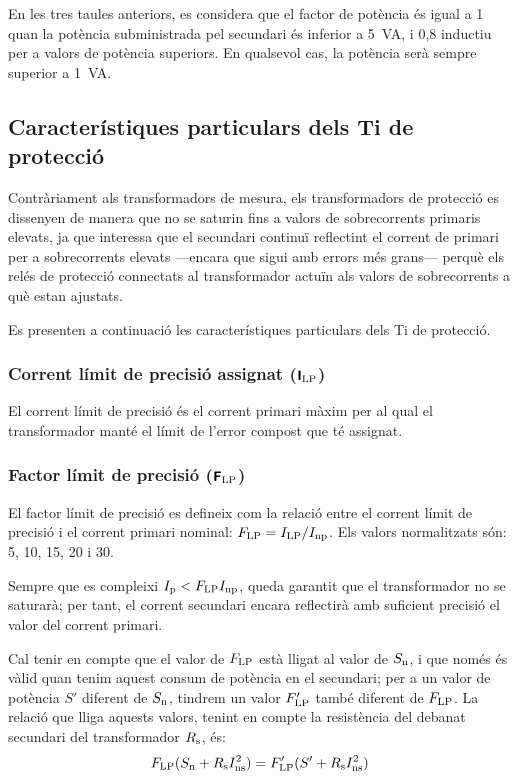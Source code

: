 En les tres taules anteriors, es considera que el factor de
potència és igual a 1 quan la potència subministrada pel secundari és inferior a \qty{5}{VA}, i 0,8 inductiu per a valors de potència superiors. En qualsevol cas, la potència serà sempre superior a \qty{1}{VA}.


\subsection{Característiques particulars dels Ti de protecció}

Contràriament als transformadors de mesura, els transformadors de
protecció es dissenyen de manera que no se saturin fins a  valors
de sobrecorrents primaris elevats, ja que interessa que el
secundari continuï reflectint el corrent de primari per a
 sobrecorrents elevats ---encara que sigui amb errors més grans--- perquè els relés de protecció connectats al transformador actuïn
als valors de sobrecorrents a què estan ajustats.

Es presenten a continuació les característiques particulars dels Ti
de protecció.

\subsubsection{Corrent límit de precisió assignat (${\boldsymbol{\mathsf{I_\text{LP}}}}$)}

El corrent
límit de precisió és el corrent primari màxim per al qual el transformador manté el límit
de l'error compost que té assignat.

\subsubsection{Factor límit de precisió (${\boldsymbol{\mathsf{F_\text{LP}}}}$) }

 El factor límit de precisió
es defineix com la relació entre el corrent límit de precisió
i el corrent primari nominal: $F_\mathrm{LP} = I_\mathrm{LP} /I_\mathrm{np}$.
Els valors normalitzats són: 5, 10, 15, 20 i 30.

Sempre que es compleixi  $I_\mathrm{p}<F_\mathrm{LP} I_\mathrm{np}$, queda garantit
que el transformador no se saturarà; per tant, el corrent
secundari encara reflectirà amb suficient precisió el valor del corrent primari.

Cal tenir en compte que el valor de $F_\mathrm{LP}$ està lligat
 al valor de $S_\mathrm{n}$, i que només és vàlid
quan tenim aquest consum de  potència en el secundari; per a un
valor de potència $S'$ diferent de $S_\mathrm{n}$, tindrem un valor
$F'_\mathrm{LP}$ també diferent de  $F_\mathrm{LP}$. La relació que
lliga aquests valors, tenint en compte la resistència del debanat
secundari del transformador  $R_\mathrm{s}$, és:
\begin{equation}\label{eq:flp}
    F_\mathrm{LP} (S_\mathrm{n}+R_\mathrm{s}I_\mathrm{ns}^2) =
    F'_\mathrm{LP} (S'+R_\mathrm{s}I_\mathrm{ns}^2)
\end{equation}

